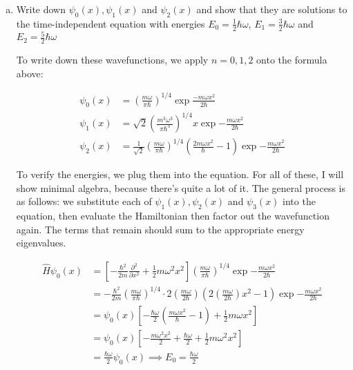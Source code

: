 \documentclass[10pt]{article}
\begin{document}
    \begin{enumerate}[(a)]
    \item Write down $\psi_0(x), \psi_1(x)$ and $\psi_2(x)$ and show that they are solutions to the time-independent \schrodinger equation with energies $E_0 = \frac{1}{2}\hbar \omega$, $E_1 = \frac{3}{2} \hbar \omega$ and $E_2 = \frac{5}{2}\hbar \omega$
    
    \begin{solution}
        To write down these wavefunctions, we apply $n = 0, 1, 2$ onto the formula above: 

        \begin{align*}
            \psi_0(x) &= \left(\frac{m\omega}{\pi \hbar}\right)^{1/4} \exp{\frac{-m\omega x^2}{2\hbar}}\\
            \psi_1(x) &= \sqrt{2} \left(\frac{m^3\omega^3}{\pi \hbar^3}\right)^{1/4} x \exp{-\frac{m\omega x^2}{2\hbar}}\\
            \psi_2(x) &= \frac{1}{\sqrt{2}} \left(\frac{m\omega}{\pi \hbar}\right)^{1/4}\left(\frac{2 m\omega x^2}{\hbar} - 1\right) \exp{-\frac{m\omega x^2}{2\hbar}}
        \end{align*}

        To verify the energies, we plug them into the \schrodinger equation. For all of these, I will show minimal algebra, because there's quite a lot of it. The general process is as follows: we substitute each of $\psi_1(x), \psi_2(x)$ and $\psi_3(x)$ into the \schrodinger equation, then evaluate the Hamiltonian then factor out the wavefunction again. The terms that remain should sum to the appropriate energy eigenvalues. 

        \begin{align*}
            \hat H \psi_0(x) &= \left[-\frac{\hbar^2}{2m}\frac{\partial^2}{\partial x^2} + \frac{1}{2} m\omega^2x^2\right] \left(\frac{m\omega}{\pi \hbar}\right)^{1/4} \exp{-\frac{m\omega x^2}{2\hbar}}\\
            &= -\frac{\hbar^2}{2m} \left(\frac{m\omega}{\pi \hbar}\right)^{1/4} \cdot 2 \left(\frac{m \omega}{2\hbar}\right)\left(2 \left(\frac{m\omega}{2\hbar}\right)x^2 - 1\right) \exp{-\frac{m\omega x^2}{2\hbar}}\\
            &= \psi_0(x) \left[-\frac{\hbar \omega}{2} \left(\frac{m\omega x^2}{\hbar} - 1\right) + \frac{1}{2} m \omega x^2\right]\\
            &= \psi_0(x) \left[-\frac{m\omega^2x^2}{2} + \frac{\hbar \omega}{2} + \frac{1}{2} m \omega^2x^2\right]\\
            &= \frac{\hbar \omega}{2} \psi_0(x) \implies E_0 = \frac{\hbar\omega}{2}
        \end{align*}


\end{solution}
\end{enumerate}
\end{document}
